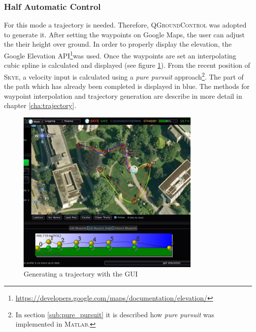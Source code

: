 \subsubsection{Half Automatic Control}
\label{subsub:halfautomaticcontrol}
For this mode a trajectory is needed. Therefore, \textsc{QGroundControl} was adopted to generate it. After setting the waypoints on Google Maps, the user can adjust the their height over ground. In order to properly display the elevation, the Google Elevation API\footnote{\url{https://developers.google.com/maps/documentation/elevation/}}was used. Once the waypoints are set an interpolating cubic spline is calculated and displayed (see figure \ref{fig:qgc_automatic_control}). From the recent position of \textsc{Skye}, a velocity input is calculated using a \textit{pure pursuit} approach\footnote{In section \ref{sub:pure_pursuit} it is described how \textit{pure pursuit} was implemented in \textsc{Matlab}.}. The part of the path which has already been completed is displayed in blue. The methods for waypoint interpolation and trajectory generation are describe in more detail in chapter \ref{cha:trajectory}.%

\begin{figure}[H] %
	\begin{center}
		\includegraphics[width=0.8\textwidth]{qgc_automatic_control}
		\caption{Generating a trajectory with the GUI}
		\label{fig:qgc_automatic_control}		
	\end{center}
\end{figure}

